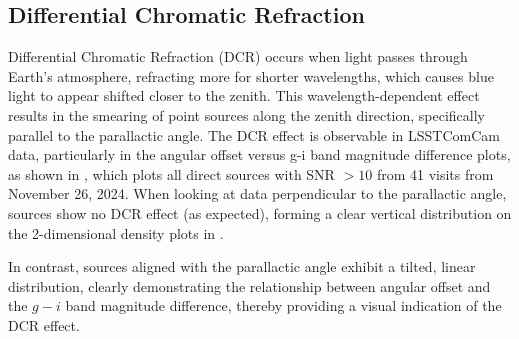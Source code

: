 \subsection{Differential Chromatic Refraction}
\label{sec:differential_chromatic_refraction}
\gls{Differential Chromatic Refraction} (DCR) occurs when light passes through Earth’s atmosphere, refracting more for shorter wavelengths, which causes blue light to appear shifted closer to the zenith. 
This wavelength-dependent effect results in the smearing of point sources along the zenith direction, specifically parallel to the parallactic angle. 
The DCR effect is observable in LSSTComCam data, particularly in the angular offset versus g-i band magnitude difference plots,  as shown in , which plots all direct sources with \gls{SNR} $>10$ from 41 visits from November 26, 2024. 
When looking at data perpendicular to the parallactic angle, sources show no DCR effect (as expected), forming a clear vertical distribution on the 2-dimensional density plots in .

In contrast, sources aligned with the parallactic angle exhibit a tilted, linear distribution, clearly demonstrating the relationship between angular offset and the $g-i$ band magnitude difference, thereby providing a visual indication of the \gls{DCR} effect.

